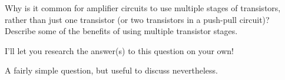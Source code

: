 

Why is it common for amplifier circuits to use multiple stages of transistors, rather than just one transistor (or two transistors in a push-pull circuit)?  Describe some of the benefits of using multiple transistor stages.







I'll let you research the answer(s) to this question on your own!







A fairly simple question, but useful to discuss nevertheless.




